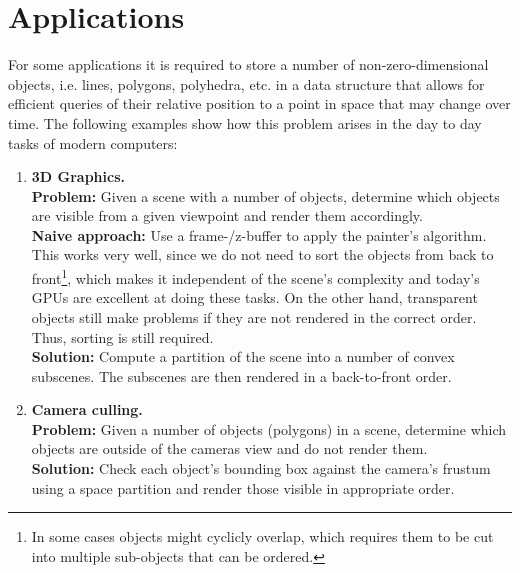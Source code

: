 \section{Applications}
    For some applications it is required to store a number of non-zero-dimensional objects, i.e. lines, polygons, polyhedra, etc. in a data structure that allows for efficient queries of their relative position to a point in space that may change over time. The following examples show how this problem arises in the day to day tasks of modern computers:
    \begin{enumerate}
        \item \textbf{3D Graphics.} \\
        \textbf{Problem:} Given a scene with a number of objects, determine which objects are visible from a given viewpoint and render them accordingly. \\
        \textbf{Naive approach:} Use a frame-/z-buffer to apply the painter's algorithm. This works very well, since we do not need to sort the objects from back to front\footnote{In some cases objects might cyclicly overlap, which requires them to be cut into multiple sub-objects that can be ordered.}, which makes it independent of the scene's complexity and today's GPUs are excellent at doing these tasks. On the other hand, transparent objects still make problems if they are not rendered in the correct order. Thus, sorting is still required. \\   
        \textbf{Solution:} Compute a partition of the scene into a number of convex subscenes. The subscenes are then rendered in a back-to-front order.
        
        \item \textbf{Camera culling.} \\
        \textbf{Problem:} Given a number of objects (polygons) in a scene, determine which objects are outside of the cameras view and do not render them. \\ 
        \textbf{Solution:} Check each object's bounding box against the camera's frustum using a space partition and render those visible in appropriate order. 
    \end{enumerate} 


